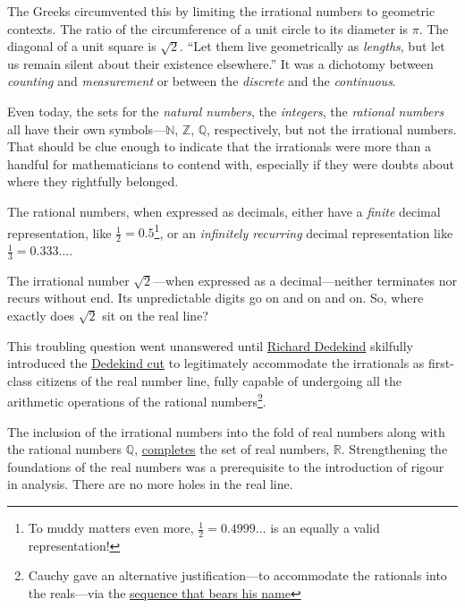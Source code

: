 \documentclass[
  a4paper,
]{article}
\begin{document}
The Greeks circumvented this by limiting the irrational numbers to
geometric contexts. The ratio of the circumference of a unit circle to
its diameter is \(\pi\). The diagonal of a unit square is \(\sqrt{2}\).
``Let them live geometrically as \emph{lengths}, but let us remain
silent about their existence elsewhere.'' It was a dichotomy between
\emph{counting} and \emph{measurement} or between the \emph{discrete}
and the \emph{continuous}.

Even today, the sets for the \emph{natural numbers}, the
\emph{integers}, the \emph{rational numbers} all have their own
symbols---\(\mathbb{N}\), \(\mathbb{Z}\), \(\mathbb{Q}\), respectively,
but not the irrational numbers. That should be clue enough to indicate
that the irrationals were more than a handful for mathematicians to
contend with, especially if they were doubts about where they rightfully
belonged.

The rational numbers, when expressed as decimals, either have a
\emph{finite} decimal representation, like
\(\frac{1}{2} = 0.5\)\footnote{To muddy matters even more,
  \(\frac{1}{2} = 0.4999\dots\) is an equally a valid representation!},
or an \emph{infinitely recurring} decimal representation like
\(\frac{1}{3} = 0.333\dots\).

The irrational number \(\sqrt{2}\)---when expressed as a
decimal---neither terminates nor recurs without end. Its unpredictable
digits go on and on and on. So, where exactly does \(\sqrt{2}\) sit on
the real line?

This troubling question went unanswered until
\href{https://plato.stanford.edu/entries/dedekind-foundations/}{Richard
Dedekind} skilfully introduced the
\href{https://www.britannica.com/science/Dedekind-cut}{Dedekind cut} to
legitimately accommodate the irrationals as first-class citizens of the
real number line, fully capable of undergoing all the arithmetic
operations of the rational numbers\footnote{Cauchy gave an alternative
  justification---to accommodate the rationals into the reals---via the
  \hyperref[cauchy-sequence]{sequence that bears his name}}.

The inclusion of the irrational numbers into the fold of real numbers
along with the rational numbers \(\mathbb{Q}\),
\href{https://en.wikipedia.org/wiki/Completeness_of_the_real_numbers}{completes}
the set of real numbers, \(\mathbb{R}\). Strengthening the foundations
of the real numbers was a prerequisite to the introduction of rigour in
analysis. There are no more holes in the real line.
\end{document}
